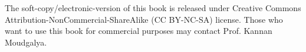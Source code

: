     \noindent The soft-copy/electronic-version of this book is released under
    Creative Commons Attribution-NonCommercial-ShareAlike (CC BY-NC-SA)
    license.  Those who want to use this book for commercial purposes may
    contact Prof. Kannan Moudgalya.

\cleardoublepage

